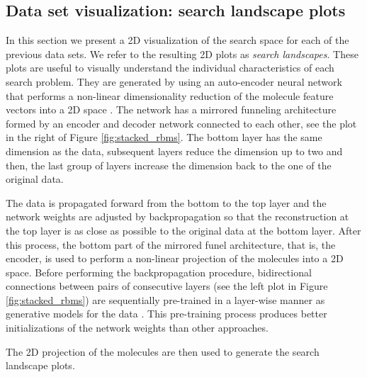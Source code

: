 \subsection{Data set visualization: search landscape plots}

In this section we present a 2D visualization of the search space for each of
the previous data sets. We refer to the resulting 2D plots as \emph{search
landscapes}. These plots are useful to visually understand the individual
characteristics of each search problem. They are generated by using an
auto-encoder neural network that performs a non-linear dimensionality reduction of the molecule feature vectors
into a 2D space \cite{Hinton_2006}. The network has a mirrored
funneling architecture formed by an encoder and decoder network connected to
each other, see the plot in the
right of Figure \ref{fig:stacked_rbms}. The bottom layer has the same dimension as the data, subsequent
layers reduce the dimension up to two and then, the last group of layers
increase the dimension back to the one of the original data. 

The data is propagated forward from the bottom to the top layer and the network
weights are adjusted by backpropagation so that the reconstruction at the top
layer is as close as possible to the original data at the bottom layer. After
this process, the bottom part of the mirrored funel architecture, that is, the
encoder, is used to perform a non-linear projection of the molecules into a 2D
space. Before performing the backpropagation procedure, bidirectional
connections between pairs of consecutive layers (see the left plot in Figure
\ref{fig:stacked_rbms}) are sequentially pre-trained in a layer-wise manner as
generative models for the data \cite{Hinton_2006}. This pre-training process
produces better initializations of the network weights than other approaches.

The 2D projection of the molecules are then used to generate the search
landscape plots.

